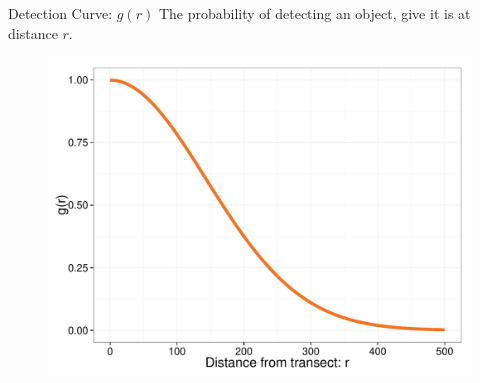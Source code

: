 \documentclass{beamer}
\begin{document}
\begin{frame}{Detection Curve: $g(r)$}
The probability of detecting an object, give it is at distance $r$.
	\begin{figure}
		\centering
		\includegraphics[width=\textwidth,height=0.80\textheight,keepaspectratio=true]{../images/detectionCurve.pdf}
	\end{figure}
\end{frame}
\end{document}
